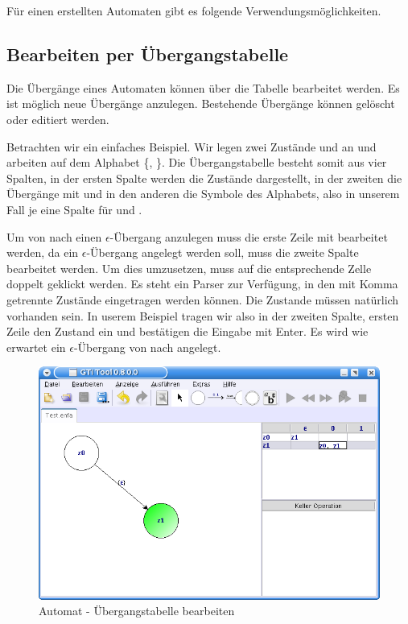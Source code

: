 Für einen erstellten Automaten gibt es folgende
Ver\-wen\-dungs\-möglich\-keiten.


\subsection{Bearbeiten per Übergangstabelle}

Die Übergänge eines Automaten können über die Tabelle bearbeitet werden. Es ist
möglich neue Übergänge anzulegen. Bestehende Übergänge können gelöscht oder
editiert werden.\vspace{10pt}

Betrachten wir ein einfaches Beispiel. Wir legen zwei Zustände  und
 an und arbeiten auf dem Alphabet \{, \}. Die
Übergangstabelle besteht somit aus vier Spalten, in der ersten Spalte werden die
Zustände dargestellt, in der zweiten die Übergänge mit \Symbol{$\epsilon$} und in
den anderen die Symbole des Alphabets, also in unserem Fall je eine Spalte für
 und .\vspace{10pt}

Um von  nach  einen $\epsilon$-Übergang anzulegen muss die
erste Zeile mit  bearbeitet werden, da ein $\epsilon$-Übergang angelegt
werden soll, muss die zweite Spalte bearbeitet werden. Um dies umzusetzen, muss
auf die entsprechende Zelle doppelt geklickt werden. Es steht ein Parser zur
Verfügung, in den mit Komma getrennte Zustände eingetragen werden können. Die
Zustande müssen natürlich vorhanden sein. In userem Beispiel tragen wir also in
der zweiten Spalte, ersten Zeile den Zustand  ein und bestätigen die
Eingabe mit Enter. Es wird wie erwartet ein $\epsilon$-Übergang von 
nach  angelegt.\vspace{10pt}

\begin{figure}[h]
\begin{center}
\includegraphics[width=12cm]{images/machine_table.png}
\caption{Automat - Übergangstabelle bearbeiten}
\end{center}
\end{figure}

